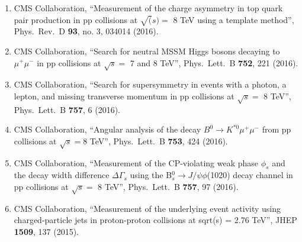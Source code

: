 \begin{enumerate}
\item CMS Collaboration, ``Measurement of the charge asymmetry in top quark pair production in pp collisions at $\sqrt(s) =$ 8 TeV using a template method'', Phys.\ Rev.\ D {\bf 93}, no. 3, 034014 (2016).

\item CMS Collaboration, ``Search for neutral MSSM Higgs bosons decaying to $\mu^{+} \mu^{-}$ in pp collisions at $ \sqrt{s} =$ 7 and 8 TeV'', Phys.\ Lett.\ B {\bf 752}, 221 (2016).

\item CMS Collaboration, ``Search for supersymmetry in events with a photon, a lepton, and missing transverse momentum in pp collisions at $\sqrt s=$ 8 TeV'', Phys.\ Lett.\ B {\bf 757}, 6 (2016).

\item CMS Collaboration, ``Angular analysis of the decay $B^0 \to K^{*0} \mu^+ \mu^-$ from pp collisions at $\sqrt  s = 8$ TeV'', Phys.\ Lett.\ B {\bf 753}, 424 (2016).

\item CMS Collaboration, ``Measurement of the CP-violating weak phase $\phi_s$ and the decay width difference $\Delta \Gamma_s$ using the B$_s^0 \to J/\psi\phi$(1020) decay channel in pp collisions at $\sqrt{s}=$ 8 TeV'', Phys.\ Lett.\ B {\bf 757}, 97 (2016).

\item CMS Collaboration, ``Measurement of the underlying event activity using charged-particle jets in proton-proton collisions at sqrt(s) = 2.76 TeV'', JHEP {\bf 1509}, 137 (2015).


\end{enumerate}
